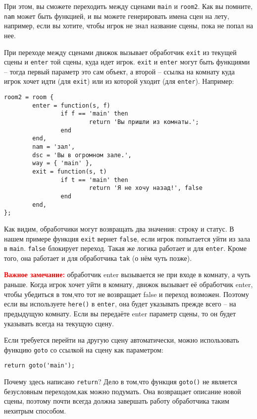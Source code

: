 \documentclass[a4paper,12pt]{article}
\begin{document}
При этом, вы сможете переходить между сценами \verb/main/ и \verb/room2/. Как вы помните, \verb/nam/ может быть функцией, и вы можете генерировать имена сцен на лету, например, если вы хотите, чтобы игрок не знал название сцены, пока не попал на нее.

При переходе между сценами движок вызывает обработчик \verb/exit/ из текущей сцены и \verb/enter/ той сцены, куда идет игрок. \verb/exit/ и \verb/enter/ могут быть функциями -- тогда первый параметр это сам объект, а второй -- ссылка на комнату куда игрок хочет идти (для \verb/exit/) или из которой уходит (для \verb/enter/). Например:

\begin{verbatim}
room2 = room {
        enter = function(s, f)
                if f == 'main' then
                        return 'Вы пришли из комнаты.';
                end
        end,
        nam = 'зал',
        dsc = 'Вы в огромном зале.',
        way = { 'main' },
        exit = function(s, t)
                if t == 'main' then
                        return 'Я не хочу назад!', false
                end
        end,
};
\end{verbatim}

Как видим, обработчики могут возвращать два значения: строку и статус. В нашем примере функция \verb/exit/ вернет \verb/false/, если игрок попытается уйти из зала в \verb/main/. \verb/false/ блокирует переход. Такая же логика работает и для \verb/enter/. Кроме того, она работает и для обработчика \verb/tak/ (о нём чуть позже).

\textbf{\textcolor{red}{Важное замечание:}} обработчик enter вызывается не при входе в комнату, а чуть раньше. Когда игрок хочет уйти в комнату, движок вызывает её обработчик enter, чтобы убедиться в том,что тот не возвращает false и переход возможен. Поэтому если вы используете \verb/here()/ в \verb/enter/, она будет указывать прежде всего -- на предыдущую комнату. Если вы передаёте enter параметр сцены, то он будет указывать всегда на текущую сцену.

Если требуется перейти на другую сцену автоматически, можно использовать функцию \verb/goto/ со ссылкой на сцену как параметром:

\begin{verbatim}
return goto('main');
\end{verbatim}

Почему здесь написано \verb/return/? Дело в том,что функция \verb/goto()/ не является безусловным переходом,как можно подумать. Она возвращает описание новой сцены, поэтому почти всегда должна завершать работу обработчика таким нехитрым способом.
\end{document}
